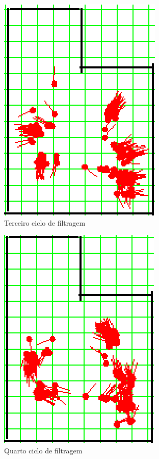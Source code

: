 \begin{figure}[H]
  \centering
  \includegraphics[scale=0.6]{figuras/cen1_ex2/4.eps}
  \caption[Terceiro Ciclo de Filtragem]{Terceiro ciclo de filtragem}
  \label{img:cen1_ex2_4}
\end{figure}

\begin{figure}[H]
  \centering
  \includegraphics[scale=0.6]{figuras/cen1_ex2/5.eps}
  \caption[Quarto Ciclo de Filtragem]{Quarto ciclo de filtragem}
  \label{img:cen1_ex2_5}
\end{figure}

